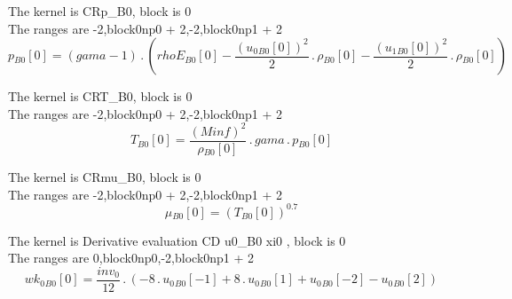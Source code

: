 \documentclass{article}
\begin{document}
\noindent The kernel is CRp_B0, block is 0\\\noindent The ranges are -2,block0np0 + 2,-2,block0np1 + 2\\\begin{dmath}{p{_{B0}}}[{0}] = \left(gama - 1\right) \,.\, \left({rhoE{_{B0}}}[{0}] - \frac{\left({u_{0}{_{B0}}}[{0}] \right)^{2}}{2} \,.\, {\rho{_{B0}}}[{0}] - \frac{\left({u_{1}{_{B0}}}[{0}] \right)^{2}}{2} \,.\, 
{\rho{_{B0}}}[{0}]\right)\end{dmath}

\noindent The kernel is CRT_B0, block is 0\\\noindent The ranges are -2,block0np0 + 2,-2,block0np1 + 2\\\begin{dmath}{T{_{B0}}}[{0}] = \frac{\left(Minf \right)^{2}}{{\rho{_{B0}}}[{0}]} \,.\, gama \,.\, {p{_{B0}}}[{0}]\end{dmath}

\noindent The kernel is CRmu_B0, block is 0\\\noindent The ranges are -2,block0np0 + 2,-2,block0np1 + 2\\\begin{dmath}{\mu{_{B0}}}[{0}] = \left({T{_{B0}}}[{0}] \right)^{0.7}\end{dmath}

\noindent The kernel is Derivative evaluation CD u0_B0 xi0 , block is 0\\\noindent The ranges are 0,block0np0,-2,block0np1 + 2\\\begin{dmath}{wk_{0}{_{B0}}}[{0}] = \frac{inv_0}{12} \,.\, \left(- 8 \,.\, {u_{0}{_{B0}}}[{-1}] + 8 \,.\, {u_{0}{_{B0}}}[{1}] + {u_{0}{_{B0}}}[{-2}] - {u_{0}{_{B0}}}[{2}]\right)\end{dmath}
\end{document}

